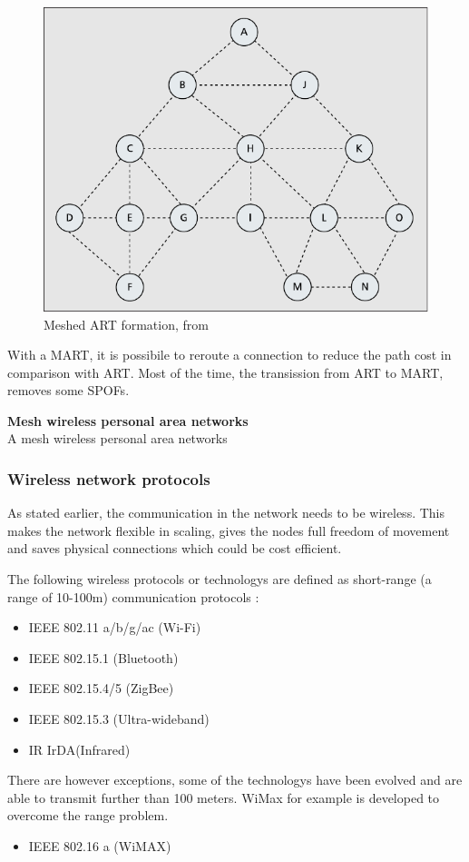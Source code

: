 \documentclass[10pt,a4paper]{article}
\begin{document}
\begin{figure}[H]
   \centering
   \includegraphics[width=1\textwidth]{meshtree}
   \caption{Meshed ART formation, from \cite{emergingstandarsforwirelessmeshtechnology}}
   \label{fig:meshtree}
\end{figure}

With a MART, it is possibile to reroute a connection to reduce the path cost in comparison with ART. Most of the time, the transission from ART to MART, removes some SPOFs.

\textbf{\large Mesh wireless personal area networks}\\
A mesh wireless personal area networks


\subsubsection{Wireless network protocols}
As stated earlier, the communication in the network needs to be wireless. This makes the network flexible in scaling, gives the nodes full freedom of movement and saves physical connections which could be cost efficient.

The following wireless protocols or technologys are defined as short-range (a range of 10-100m) communication protocols \cite{emergingstandarsforwirelessmeshtechnology} \cite{combook}:
\begin{itemize}
\setlength\itemsep{0em}
    \item IEEE 802.11 a/b/g/ac (Wi-Fi) \cite{IEEE80211timeline}
    \item IEEE 802.15.1 (Bluetooth)
    \item IEEE 802.15.4/5 (ZigBee)
    \item IEEE 802.15.3 (Ultra-wideband)
    \item IR IrDA(Infrared)
\end{itemize}
 There are however exceptions, some of the technologys have been evolved and are able to transmit further than 100 meters. WiMax for example is developed to overcome the range problem. 
\begin{itemize}
\setlength\itemsep{0em}
     \item IEEE 802.16 a (WiMAX)
\end{itemize}
\end{document}
